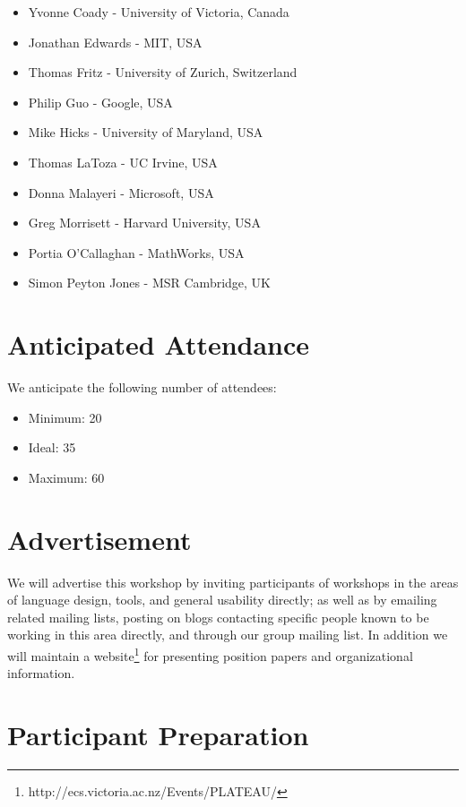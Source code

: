 \documentclass{sigplanconf}
\begin{document}
\begin{itemize}
\item Yvonne Coady - University of Victoria, Canada
\item Jonathan Edwards - MIT, USA
\item Thomas Fritz - University of Zurich, Switzerland
\item Philip Guo - Google, USA
\item Mike Hicks - University of Maryland, USA
\item Thomas LaToza - UC Irvine, USA
\item Donna Malayeri - Microsoft, USA
\item Greg Morrisett - Harvard University, USA
\item Portia O'Callaghan - MathWorks, USA
\item Simon Peyton Jones - MSR Cambridge, UK
\end{itemize}


\section{Anticipated Attendance}

We anticipate the following number of attendees:

\begin{itemize}
\item Minimum: 20 
\item Ideal: 35
\item Maximum: 60 
\end{itemize}

\section{Advertisement}

We will advertise this workshop by inviting participants of workshops
in the areas of language design, tools, and general usability
directly; as well as by emailing related mailing lists, posting on
blogs contacting specific people known to be working in this area directly,
and through our group mailing list. In addition we will maintain a website\footnote{http://ecs.victoria.ac.nz/Events/PLATEAU/} for presenting position papers and organizational information.

\section{Participant Preparation}\label{preparation}
\end{document}
